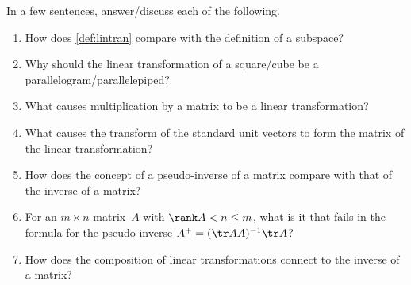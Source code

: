 \begin{exercise}  
In a few sentences, answer\slash discuss each of the following.
\begin{enumerate}
\item How does \cref{def:lintran} compare with the definition of a subspace?

\item Why should the linear transformation of a square\slash cube be a parallelogram\slash parallelepiped?

\item What causes multiplication by a matrix to be a linear transformation?

\item What causes the transform of the standard unit vectors to form the matrix of the linear transformation?

\item How does the concept of a pseudo-inverse of a matrix compare with that of the inverse of a matrix?

\item For an \(m\times n\) matrix~\(A\) with \(\rank A<n\leq m\), what is it that fails in the formula for the pseudo-inverse \(A^+=(\tr AA)^{-1}\tr A\)?

\item How does the composition of linear transformations connect to the inverse of a matrix?

\end{enumerate}
\end{exercise}

